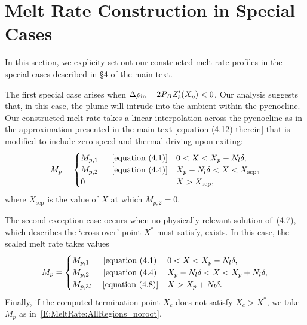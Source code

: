 \documentclass{article}
\begin{document}
\section{Melt Rate Construction in Special Cases}
In this section, we explicity set out our constructed melt rate profiles in the special cases described in \S4 of the main text.

The first special case arises when $\Delta \rho_{\text{in}} - 2 \textit{P}_B Z_b'(X_p) < 0$. Our analysis suggests that, in this case, the plume will intrude into the ambient within the pycnocline. Our constructed melt rate takes a linear interpolation across the pycnocline as in the approximation presented in the main text [equation (4.12) therein] that is modified to include zero speed and thermal driving upon exiting:
\begin{equation}\label{E:MeltRate1}
M_{p} = \begin{cases} 
M_{p,1~} \text{~\quad [equation~(4.1)]}  & 0 < X < X_p - N_l \delta,\\
M_{p,2~} \text{~\quad [equation~(4.4)]} & X_p - N_l \delta < X <X_{\text{sep}} ,\\
0  &  X > X_{\text{sep}},\\
\end{cases}
\end{equation}
where $X_{\text{sep}}$ is the value of $X$ at which $M_{p,2} = 0$. 

The second exception case occurs when no physically relevant solution of~(4.7), which describes the `cross-over' point $X^*$ must satisfy, exists. In this case,  the scaled melt rate takes values
\begin{equation}\label{E:MeltRate:AllRegions_noroot}
M_{p} = \begin{cases} 
M_{p,1~} \text{~\quad [equation~(4.1)]}  & 0 < X < X_p - N_l \delta,\\
M_{p,2~} \text{~\quad [equation~(4.4)]} & X_p - N_l \delta < X < X_p + N_l \delta,\\
M_{p,3l~} \text{\quad [equation~(4.8)]} &  X > X_p + N_l \delta.
\end{cases}
\end{equation}
Finally, if the computed termination point $X_c$ does not satisfy $X_c > X^*$, we take $M_p$ as in~\eqref{E:MeltRate:AllRegions_noroot}.
\end{document}
